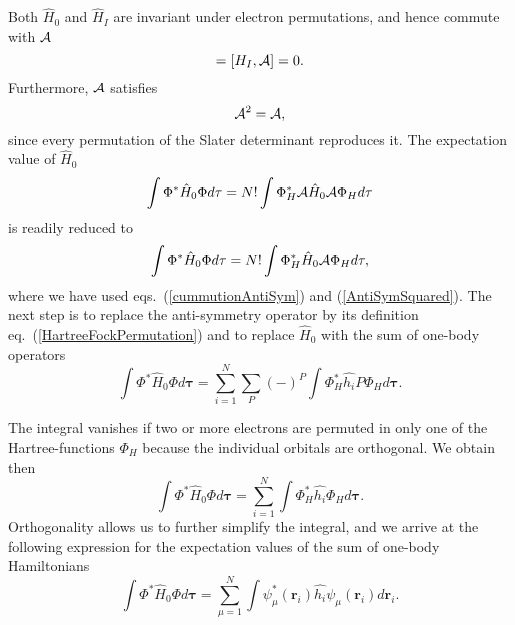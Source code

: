 Both $\hat{H}_0$ and $\hat{H}_I$ are invariant under electron
permutations, and hence commute with ${\cal A}$
\begin{equation}
  [H_0,{\cal A}] = [H_I,{\cal A}] = 0.
  \label{cummutionAntiSym}
\end{equation}
Furthermore, ${\cal A}$ satisfies
\begin{equation}
  {\cal A}^2 = {\cal A},
  \label{AntiSymSquared}
\end{equation}
since every permutation of the Slater
determinant reproduces it. The expectation value of $\hat{H}_0$ 
\[
  \int \Phi^*\hat{H}_0\Phi d\mathbf{\tau} 
  = N! \int \Phi_H^*{\cal A}\hat{H}_0{\cal A}\Phi_H d\mathbf{\tau}
\]
is readily reduced to
\[
  \int \Phi^*\hat{H}_0\Phi d\mathbf{\tau} 
  = N! \int \Phi_H^*\hat{H}_0{\cal A}\Phi_H d\mathbf{\tau},
\]
where we have used eqs.~(\ref{cummutionAntiSym}) and
(\ref{AntiSymSquared}). The next step is to replace the anti-symmetry
operator by its definition eq.~(\ref{HartreeFockPermutation}) and to
replace $\hat{H}_0$ with the sum of one-body operators
\begin{equation}
  \int \Phi^*\hat{H}_0\Phi  d\mathbf{\tau}
  = \sum_{i=1}^N \sum_{P} (-)^P\int 
  \Phi_H^*\hat{h_i}P\Phi_H d\mathbf{\tau}.
\end{equation}

The integral vanishes if two or more electrons are permuted in only one
of the Hartree-functions $\Phi_H$ because the individual orbitals are
orthogonal. We obtain then
\begin{equation}
  \int \Phi^*\hat{H}_0\Phi  d\mathbf{\tau}
  = \sum_{i=1}^N \int \Phi_H^*\hat{h_i}\Phi_H  d\mathbf{\tau}.
\end{equation}
Orthogonality allows us to further simplify the integral, and we
arrive at the following expression for the expectation values of the
sum of one-body Hamiltonians 
\begin{equation}
  \int \Phi^*\hat{H}_0\Phi  d\mathbf{\tau}
  = \sum_{\mu=1}^N \int \psi_{\mu}^*(\mathbf{r}_i)\hat{h_i}\psi_{\mu}(\mathbf{r}_i)
  d\mathbf{r}_i.
  \label{eq:H1Expectation}
\end{equation}

